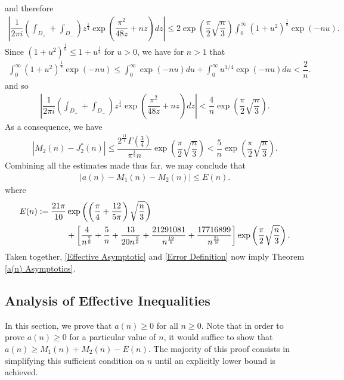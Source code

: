 \documentclass[11pt,reqno]{amsart}
\theoremstyle{definition}
\theoremstyle{plain}
\theoremstyle{named}
\numberwithin{equation}{section}
\theoremstyle{example}
\def\lp{\left(}
\def\rp{\right)}
\begin{document}
and therefore
\begin{align*}
	\left| \dfrac{1}{2\pi i} \lp \int_{D_+} + \int_{D_-} \rp z^{\frac 14} \exp\lp \dfrac{\pi^2}{48z} + nz \rp dz \right| \leq 2 \exp\lp \dfrac{\pi}{2} \sqrt{\dfrac{n}{3}} \rp \int_0^\infty \lp 1 + u^2 \rp^{\frac 18} \exp\lp -nu \rp.
\end{align*}
Since $\lp 1 + u^2 \rp^{\frac 18} \leq 1 + u^{\frac 14}$ for $u > 0$, we have for $n > 1$ that
\begin{align*}
	\int_0^\infty \lp 1 + u^2 \rp^{\frac 18} \exp\lp -nu \rp \leq \int_0^\infty \exp\lp -nu \rp du + \int_0^\infty u^{1/4} \exp\lp -nu \rp du < \dfrac{2}{n}.
\end{align*}
and so
\begin{align*}
	\left| \dfrac{1}{2\pi i} \lp \int_{D_+} + \int_{D_-} \rp z^{\frac 14} \exp\lp \dfrac{\pi^2}{48z} + nz \rp dz \right| < \dfrac{4}{n} \exp\lp \dfrac{\pi}{2} \sqrt{\dfrac{n}{3}} \rp.
\end{align*}
As a consequence, we have
\begin{align*}
	\left| M_2(n) - J_2^*(n) \right| \leq \dfrac{2^{\frac{11}{4}} \Gamma\lp \frac 34 \rp}{\pi^{\frac 12} n} \exp\lp \dfrac{\pi}{2} \sqrt{\dfrac{n}{3}} \rp < \dfrac{5}{n} \exp\lp \dfrac{\pi}{2} \sqrt{\dfrac{n}{3}} \rp.
\end{align*}
Combining all the estimates made thus far, we may conclude that
\begin{align} \label{Effective Asymptotic}
	\left|a(n) - M_1(n) - M_2(n) \right| \leq E(n).
\end{align}
where
\begin{align} \label{Error Definition}
	E(n) := \dfrac{21\pi}{10} & \exp\lp \lp \dfrac{\pi}{4} + \dfrac{12}{5\pi} \rp \sqrt{\dfrac{n}{3}} \rp \notag \\ &+ \left[ \dfrac{4}{n^{\frac 78}} + \dfrac{5}{n} + \dfrac{13}{20 n^{\frac 98}} + \dfrac{21291081}{n^{\frac{19}{8}}} + \dfrac{17716899}{n^{\frac{21}{8}}} \right] \exp\lp \dfrac{\pi}{2} \sqrt{\dfrac{n}{3}} \rp.
\end{align}
Taken together, \eqref{Effective Asymptotic} and \eqref{Error Definition} now imply Theorem \ref{a(n) Asymptotics}.

\subsection{Analysis of Effective Inequalities}

In this section, we prove that $a(n) \geq 0$ for all $n \geq 0$. Note that in order to prove $a(n) \geq 0$ for a particular value of $n$, it would suffice to show that $a(n) \geq M_1(n) + M_2(n) - E(n)$. The majority of this proof consists in simplifying this sufficient condition on $n$ until an explicitly lower bound is achieved. 
\end{document}
